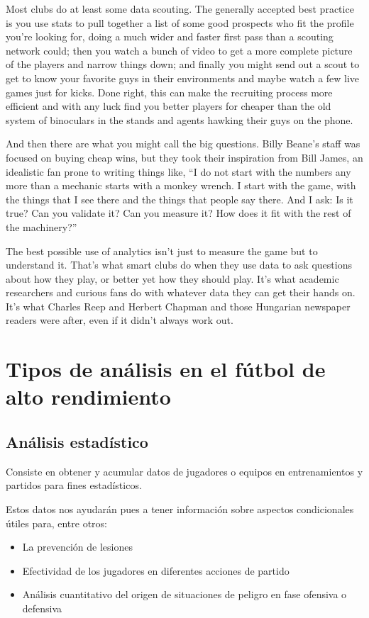 Most clubs do at least some data scouting. The generally accepted best 
practice is you use stats to pull together a list of some good prospects 
who fit the profile you’re looking for, doing a much wider and faster 
first pass than a scouting network could; then you watch a bunch of video 
to get a more complete picture of the players and narrow things down; 
and finally you might send out a scout to get to know your favorite 
guys in their environments and maybe watch a few live games just for 
kicks. Done right, this can make the recruiting process more efficient 
and with any luck find you better players for cheaper than the old 
system of binoculars in the stands and agents hawking their guys 
on the phone. 

And then there are what you might call the big questions. Billy Beane’s 
staff was focused on buying cheap wins, but they took their inspiration 
from Bill James, an idealistic fan prone to writing things like, 
“I do not start with the numbers any more than a mechanic starts with 
a monkey wrench. I start with the game, with the things that I see 
there and the things that people say there. And I ask: Is it true? 
Can you validate it? Can you measure it? How does it fit with the 
rest of the machinery?”

The best possible use of analytics isn’t just to measure the game 
but to understand it. That’s what smart clubs do when they use data 
to ask questions about how they play, or better yet how they should 
play. It’s what academic researchers and curious fans do with whatever 
data they can get their hands on. It’s what Charles Reep and Herbert 
Chapman and those Hungarian newspaper readers were after, even if it 
didn’t always work out.

\section{Tipos de análisis en el fútbol de alto rendimiento}

\subsection{Análisis estadístico}
Consiste en obtener y acumular datos de jugadores o equipos 
en entrenamientos y partidos para fines estadísticos.

Estos datos nos ayudarán pues a tener información sobre aspectos condicionales 
útiles para, entre otros:

\begin{itemize}
    \item La prevención de lesiones
    \item Efectividad de los jugadores en diferentes acciones de partido
    \item Análisis cuantitativo del origen de situaciones de peligro en 
    fase ofensiva o defensiva
\end{itemize}

